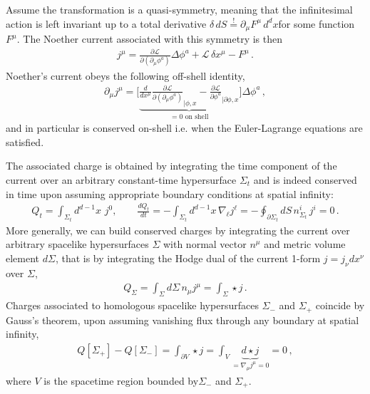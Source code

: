 \documentclass[../QFT_main.tex]{subfiles}
\begin{document}
\begin{mytheorem}
Assume the transformation is a quasi-symmetry, meaning that the infinitesimal action is left invariant up to a total derivative $\delta\, dS \overset{!}{=} \partial_\mu F^\mu\,d^d\!x$for some function $F^\mu$.
The Noether current associated with this symmetry is then
{\small\begin{align}
    j^\mu = \frac{\partial \mathcal{L}}{\partial (\partial_\mu \phi^a)} \Delta \phi^a + \mathcal{L}\,  \delta x^\mu- F^\mu\,.
\end{align}}
Noether's current obeys the following off-shell identity, 
{\small\begin{align}
    \partial_\mu j^\mu =
    \Big[\underbrace{\tfrac{d}{dx^\mu}\tfrac{\partial\mathcal{L}}{\partial (\partial_\mu \phi^a)}_{|\phi,x}-\tfrac{\partial\mathcal{L}}{\partial \phi^a}_{|\partial\phi, x}}_{=0\,\, \text{on shell}}\Big] \Delta\phi^a\,,
\end{align}}
and in particular is conserved on-shell i.e. when the Euler-Lagrange equations are satisfied.

The associated charge is obtained by integrating the time component of the current over an arbitrary constant-time hypersurface $\Sigma_t$ and is indeed conserved in time upon assuming appropriate boundary conditions at spatial infinity:
{\small\begin{align}
    Q_t = \int_{\Sigma_t} d^{d-1}\!x\,\, j^0, \qquad \tfrac{dQ_t}{dt} = -\int_{\Sigma_t} d^{d-1}x\, \nabla_\ell j^\ell 
    =-\oint_{\partial\Sigma_t}\!\!\!\!dS\, n_{\Sigma_t}^i\,j^i= 0\,.
\end{align}}
More generally, we can build conserved charges by integrating the current over arbitrary spacelike hypersurfaces $\Sigma$ with normal vector $n^\mu$ and metric volume element $d\Sigma$, that is by integrating the Hodge dual of the current 1-form $j=j_\nu dx^\nu$ over $\Sigma$,
{\small\begin{align}
    Q_\Sigma = \int_\Sigma \!\!\!d\Sigma\, n_\mu j^\mu = \int_\Sigma \star j\,.
\end{align}}
Charges associated to homologous spacelike hypersurfaces $\Sigma_-$ and $\Sigma_+$ coincide by Gauss's theorem, upon assuming vanishing flux through any boundary at spatial infinity,
{\small\begin{align}
    Q[\Sigma_+]-Q[\Sigma_-]
    = \int_{\partial V}\star j
    =\int_{V} \underbrace{d\star j}_{=\nabla_\mu j^\mu=0}
    =0\,,
\end{align}}
where $V$ is the spacetime region bounded by$\Sigma_-$ and $\Sigma_+$.
%
\end{mytheorem}
\end{document}

